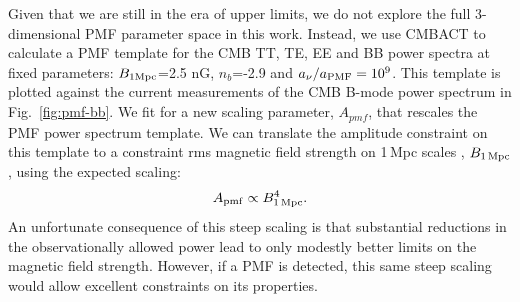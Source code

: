 \documentclass[preprint]{emulateapj}
\newcommand{\apmf}{\ensuremath{A_{\rm pmf}}}
\newcommand{\bpmf}{\ensuremath{B_{\rm 1\,Mpc}}}
\newcommand{\be}{\begin{equation}}
\newcommand{\ee}{\end{equation}}
\begin{document}
Given that we are still in the era of upper limits,  we do not explore the full 3-dimensional PMF parameter space in this work. 
Instead, we use CMBACT to calculate a PMF template for the CMB TT, TE, EE and BB power spectra at fixed parameters: $B_{\rm{1Mpc}}$=2.5 \rm{nG}, $n_b$=-2.9 and $a_{\nu}/a_{\rm{PMF}}=10^9$. 
This template is plotted against the current measurements of the CMB B-mode power spectrum in Fig.~\ref{fig:pmf-bb}. 
We fit for a new scaling parameter, $A_{pmf}$, that rescales the PMF power spectrum template. 
We can translate the amplitude constraint on this template to a constraint rms magnetic field strength on 1\,Mpc scales , \bpmf, using the expected scaling:
\be
\apmf \propto \bpmf^4.
\ee
An unfortunate consequence of this steep scaling is that substantial reductions in the observationally allowed power lead to only modestly better limits on the magnetic field strength. 
However, if a PMF is detected, this same steep scaling would allow excellent constraints on its properties. 
\end{document}
